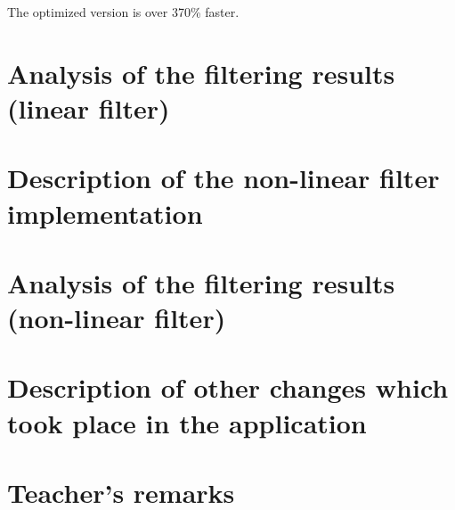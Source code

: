 \documentclass[12pt]{article}
\begin{document}
The optimized version is over 370\% faster.

\section{Analysis of the filtering results (linear filter)}

\section{Description of the non-linear filter implementation }

\section{Analysis of the filtering results (non-linear filter)}

\section{Description of other changes which took place in the application}



\vfill
\section*{Teacher's remarks}
\begin{tabularx}{\textwidth}{|X|}
    \hline
    \vspace{7cm}
    \phantom{.} \\
    \hline
\end{tabularx}
\end{document}
